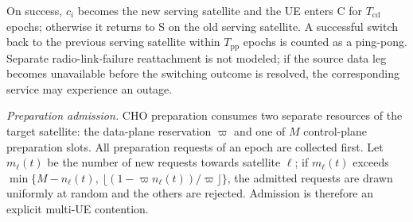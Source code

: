 \documentclass[journal]{IEEEtran}
\begin{document}
On success, $c_i$ becomes the new serving satellite and the UE enters
\textsf{C} for $T_{\mathrm{cd}}$ epochs; otherwise it returns to \textsf{S} on
the old serving satellite. A successful switch back to the previous serving
satellite within $T_{\mathrm{pp}}$ epochs is counted as a ping-pong. Separate
radio-link-failure reattachment is not modeled; if the source data leg
becomes unavailable before the switching outcome is resolved, the
corresponding service may experience an outage.

\emph{Preparation admission.} CHO preparation consumes two separate resources
of the target satellite: the data-plane reservation $\varpi$ and one of $M$
control-plane preparation slots. All preparation requests of an epoch are
collected first. Let $m_\ell(t)$ be the number of new requests towards
satellite $\ell$; if $m_\ell(t)$ exceeds
$\min\{M-n_\ell(t),\ \lfloor(1-\varpi n_\ell(t))/\varpi\rfloor\}$, the
admitted requests are drawn uniformly at random and the others are rejected.
Admission is therefore an explicit multi-UE contention.
\end{document}
